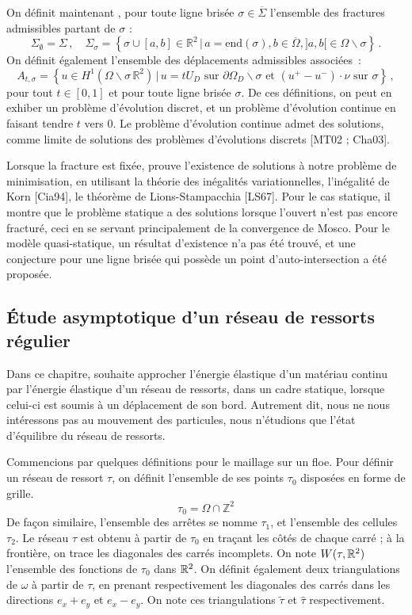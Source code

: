 On définit maintenant \parencite[p.48]{balasoiu2020thesis}, pour toute ligne brisée $\sigma \in  \overline{\Sigma}$ l’ensemble des fractures admissibles partant de $\sigma$ :
$$
\Sigma_{\emptyset} = \Sigma \,, \quad \Sigma_{\sigma} = \left\{ \sigma \cup [a,b] \in \mathbb{R}^2 \, \lvert \, a = \text{end}(\sigma), b\in \overline{\Omega}, ]a,b[ \in \Omega\backslash \sigma \right\} \,.
$$
On définit également l'ensemble des déplacements admissibles associées :
$$
A_{t,\sigma} = \left\{  u \in H^1(\Omega \backslash \sigma \, \mathbb{R}^2) \, \rvert \, u=tU_D \text{ sur } \partial \Omega_D \backslash \sigma \text{ et } (u^+ - u^{-}) \cdot \nu \text{ sur } \sigma \right\} \,,
$$
pour tout $t \in [0,1]$ et pour toute ligne brisée $\sigma$. De ces définitions, on peut en exhiber un problème d'évolution discret, et un problème d'évolution continue en faisant tendre $t$ vers $0$. Le problème d’évolution continue admet des solutions, comme limite de solutions des problèmes d’évolutions discrets [MT02 ; Cha03].

Lorsque la fracture est fixée, \citeauthor{balasoiu2020thesis} prouve l’existence de solutions à notre problème de minimisation, en utilisant la théorie des inégalités variationnelles, l'inégalité de Korn [Cia94], le théorème de Lions-Stampacchia [LS67]. Pour le cas statique, il montre que le problème statique a des solutions lorsque l’ouvert n’est pas encore fracturé, ceci en se servant principalement de la convergence de Mosco. Pour le modèle quasi-statique, un résultat d'existence n'a pas été trouvé, et une conjecture pour une ligne brisée qui possède un point d'auto-intersection a été proposée.



\subsection{Étude asymptotique d’un réseau de ressorts régulier} 

Dans ce chapitre, \citeauthor{balasoiu2020halthesis} souhaite approcher l’énergie élastique d’un matériau continu par l’énergie élastique d’un réseau de ressorts, dans un cadre statique, lorsque celui-ci est soumis à un déplacement de son bord. Autrement dit, nous ne nous intéressons pas au mouvement des particules, nous n’étudions que l’état d’équilibre du réseau de ressorts.

Commencions par quelques définitions pour le maillage sur un floe. Pour définir un réseau de ressort $\tau$, on définit l'ensemble de ses points $\tau_0$ disposées en forme de grille. 
$$
\tau_0 = \Omega \cap \mathbb{Z}^2
$$
De façon similaire, l'ensemble des arrêtes se nomme $\tau_1$, et l'ensemble des cellules $\tau_2$. Le réseau $\tau$ est obtenu à partir de $\tau_0$ en traçant les côtés de chaque carré ; à la frontière, on trace les diagonales des carrés incomplets. On note $W (\tau, \mathbb{R}^2)$ l’ensemble des fonctions de $\tau_0$ dans $\mathbb{R}^2$. On définit également deux triangulations de $\omega$ à partir de $τ$, en prenant respectivement les diagonales des carrés dans les directions $e_x + e_y$ et $e_x − e_y$. On note ces triangulations $\tilde{\tau}$ et $\hat{\tau}$ respectivement. 

